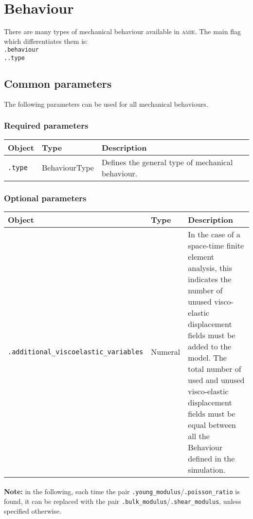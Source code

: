 \documentclass[10pt]{article}
\begin{document}
\section{Behaviour}

There are many types of mechanical behaviour available in \textsc{amie}. The main flag which differentiates them is:\\
\verb+.behaviour+\\
\verb+..type+

\subsection{Common parameters}

The following parameters can be used for all mechanical behaviours.

\subsubsection*{Required parameters}

\begin{tabularx}{\textwidth}{llX}
\hline 
Object & Type & Description \\ 
\hline 
\verb+.type+ & BehaviourType & Defines the general type of mechanical behaviour. \\ 
\hline 
\end{tabularx}

\subsubsection*{Optional parameters}

\begin{tabularx}{\textwidth}{llX}
\hline 
Object & Type & Description \\ 
\hline 
\verb+.additional_viscoelastic_variables+ & Numeral & In the case of a space-time finite element analysis, this indicates the number of unused visco-elastic displacement fields must be added to the model. The total number of used and unused visco-elastic displacement fields must be equal between all the Behaviour defined in the simulation.\\ 
\hline 
\end{tabularx}

\paragraph{} \textbf{Note:} in the following, each time the pair \verb+.young_modulus+/\verb+.poisson_ratio+ is found, it can be replaced with the pair \verb+.bulk_modulus+/\verb+.shear_modulus+, unless specified otherwise.
\end{document}
